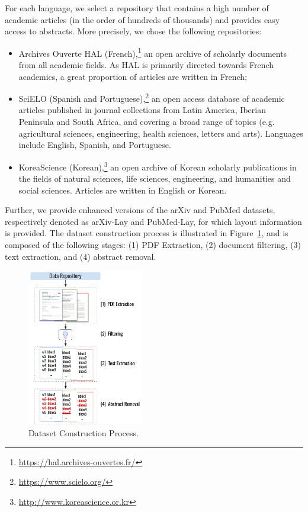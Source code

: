 For each language, we select a repository that contains a high number of academic articles (in the order of hundreds of thousands) and provides easy access to abstracts. 
More precisely, we chose the following repositories:
\begin{itemize}
    \item Archives Ouverte HAL (French),\footnote{\url{https://hal.archives-ouvertes.fr/}} an open archive of scholarly documents from all academic fields. As HAL is primarily directed towards French academics, a great proportion of articles are written in French;
    \item SciELO (Spanish and Portuguese),\footnote{\url{https://www.scielo.org/}} an open access database of academic articles published in journal collections from Latin America, Iberian Peninsula and South Africa, and covering a broad range of topics (e.g. agricultural sciences, engineering, health sciences, letters and arts). Languages include English, Spanish, and Portuguese.
    \item KoreaScience (Korean),\footnote{\url{http://www.koreascience.or.kr}} an open archive of Korean scholarly publications in the fields of natural sciences, life sciences, engineering, and humanities and social sciences. Articles are written in English or Korean.
\end{itemize}

Further, we provide enhanced versions of the arXiv and PubMed datasets, respectively denoted as arXiv-Lay and PubMed-Lay, for which layout information is provided. The dataset construction process is illustrated in Figure~\ref{fig:dataset-construction}, and is composed of the following stages: (1) PDF Extraction, (2) document filtering, (3) text extraction, and (4) abstract removal.

\begin{figure}[ht]
\centering
    \includegraphics[width=0.45\textwidth]{images/chapter5/Dataset_Construction_Process.pdf}
  \caption{Dataset Construction Process.}
  \label{fig:dataset-construction}
\end{figure}


